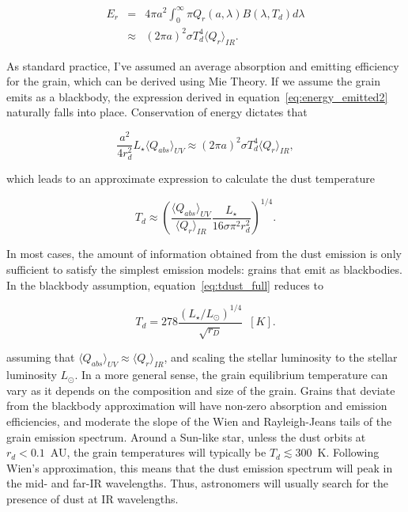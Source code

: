     \begin{eqnarray}
    E_{r} &=& 4\pi a^2 \int_0^\infty \pi Q_{r}(a,\lambda) B(\lambda,T_d)  d\lambda \label{eq:energy_emitted1}\\
          & \approx & \left(2\pi a\right)^2 \sigma T_d^4 \langle Q_{r}\rangle_{IR}. \label{eq:energy_emitted2}
    \end{eqnarray}
            
    
    \noindent As standard practice, I've assumed an average absorption and emitting efficiency for the grain, which can be derived using Mie Theory. If we assume the grain emits as a blackbody, the expression derived in equation~\ref{eq:energy_emitted2} naturally falls into place. Conservation of energy dictates that
            
            
    \begin{equation}\label{eq:conserve_energy} 
     \frac{a^2}{4r_d^2}L_\star \langle Q_{abs}\rangle_{UV} \approx \left(2\pi a\right)^2 \sigma T_d^4 \langle Q_{r}\rangle_{IR},
    \end{equation}
            
    \noindent which leads to an approximate expression to calculate the dust temperature
    
    \begin{equation}\label{eq:tdust_full}
    T_d \approx \left(\frac{\langle Q_{abs} \rangle_{UV}}{\langle Q_{r}\rangle_{IR}} \frac{L_\star}{16\sigma \pi^2 r_d^2}\right)^{1/4}.
    \end{equation}
        
    In most cases, the amount of information obtained from the dust emission is only sufficient to satisfy the simplest emission models: grains that emit as blackbodies. In the blackbody assumption, equation~\ref{eq:tdust_full} reduces to 
            
    \begin{equation}\label{eq:blackbody_temp}
            T_d = 278 \frac{\left(L_\star/L_\odot \right)^{1/4}}{\sqrt{r_D}}\enspace [K]. 
    \end{equation}
    
    \noindent assuming that $\langle Q_{abs} \rangle_{UV} \approx \langle Q_{r}\rangle_{IR}$, and scaling the stellar luminosity to the stellar luminosity $L_\odot$. In a more general sense, the grain equilibrium temperature can vary as it depends on the composition and size of the grain\citep{Draine2003}. Grains that deviate from the blackbody approximation will have non-zero absorption and emission efficiencies, and moderate the slope of the Wien and Rayleigh-Jeans tails of the grain emission spectrum. Around a Sun-like star, unless the dust orbits at $r_d<0.1$~AU, the grain temperatures will typically be $T_d \lesssim 300$~K. Following Wien's approximation, this means that the dust emission spectrum will peak in the mid- and far-IR wavelengths. Thus, astronomers will usually search for the presence of dust at IR wavelengths. 

